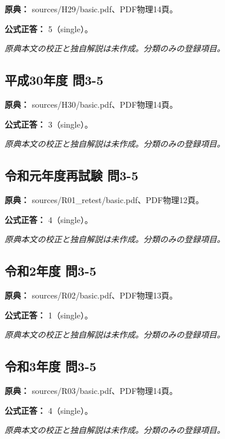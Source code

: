 \noindent\textbf{原典：} sources/H29/basic.pdf、PDF物理14頁。

\textbf{公式正答：} 5（single）。

\par\textit{原典本文の校正と独自解説は未作成。分類のみの登録項目。}

\subsection{平成30年度 問3-5}
\label{q:h30-reg-basic-3-5}

\noindent\textbf{原典：} sources/H30/basic.pdf、PDF物理14頁。

\textbf{公式正答：} 3（single）。

\par\textit{原典本文の校正と独自解説は未作成。分類のみの登録項目。}

\subsection{令和元年度再試験 問3-5}
\label{q:r01-ret-basic-3-5}

\noindent\textbf{原典：} sources/R01\_retest/basic.pdf、PDF物理12頁。

\textbf{公式正答：} 4（single）。

\par\textit{原典本文の校正と独自解説は未作成。分類のみの登録項目。}

\subsection{令和2年度 問3-5}
\label{q:r02-reg-basic-3-5}

\noindent\textbf{原典：} sources/R02/basic.pdf、PDF物理13頁。

\textbf{公式正答：} 1（single）。

\par\textit{原典本文の校正と独自解説は未作成。分類のみの登録項目。}

\subsection{令和3年度 問3-5}
\label{q:r03-reg-basic-3-5}

\noindent\textbf{原典：} sources/R03/basic.pdf、PDF物理14頁。

\textbf{公式正答：} 4（single）。

\par\textit{原典本文の校正と独自解説は未作成。分類のみの登録項目。}

